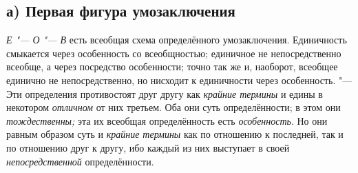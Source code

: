 \subsection[а) Первая фигура умозаключения]{а) Первая фигура умозаключения}

{\em Е "--- О "--- В}
есть всеобщая схема определённого умозаключения. Единичность
смыкается через особенность со всеобщностью; единичное не непосредственно
всеобще, а через посредство особенности; точно так же и, наоборот, всеобщее
единично не непосредственно, но нисходит к единичности через особенность.
"--- Эти определения противостоят друг другу как
{\em крайние термины} и
едины в некотором {\em отличном}
от них третьем. Оба они суть определённости; в этом они
{\em тождественны;} эта
их всеобщая определённость есть
{\em особенность}. Но они
равным образом суть и {\em крайние
термины} как по отношению к последней, так и по отношению
друг к другу, ибо каждый из них выступает в своей
{\em непосредственной}
определённости.

